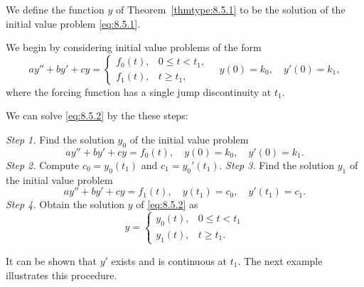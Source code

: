 \documentclass{ximera}
\begin{document}
We define the function $y$  of Theorem~\ref{thmtype:8.5.1}  to be the
solution of the initial value problem \eqref{eq:8.5.1}.

We begin by considering initial value problems of the form
\begin{equation}\label{eq:8.5.2}
ay''+by'+cy=\left\{\begin{array}{cl} f_0(t),&0\leq
t<t_1,\\f_1(t),&t\geq t_1,
\end{array}\right.\quad y(0)=k_0,\quad y'(0)=k_1,
\end{equation}
where the forcing function has a single jump discontinuity at $t_1$.

We can solve \eqref{eq:8.5.2} by  the these steps:
\begin{procedure}\label{proc:forcingfunctdisc}

\textit{Step 1.} Find the solution $y_0$ of  the initial value problem
$$
ay''+by'+cy=f_0(t), \quad  y(0)=k_0,\quad y'(0)=k_1.
$$
\textit{Step 2.} Compute $c_0=y_0(t_1)$ and $c_1=y_0'(t_1)$.
\textit{Step 3.} Find the solution $y_1$ of  the initial value problem
$$
ay''+by'+cy=f_1(t), \quad  y(t_1)=c_0,\quad y'(t_1)=c_1.
$$
\textit{Step 4.} Obtain the solution $y$ of  \eqref{eq:8.5.2} as
$$
y=\left\{\begin{array}{cl} y_0(t),&0\leq t<t_1\\y_1(t),&t\geq t_1.
\end{array}\right.
$$
\end{procedure}


It 
can be shown that $y'$  exists and is
continuous at $t_1$. The next example illustrates this procedure.
\end{document}
